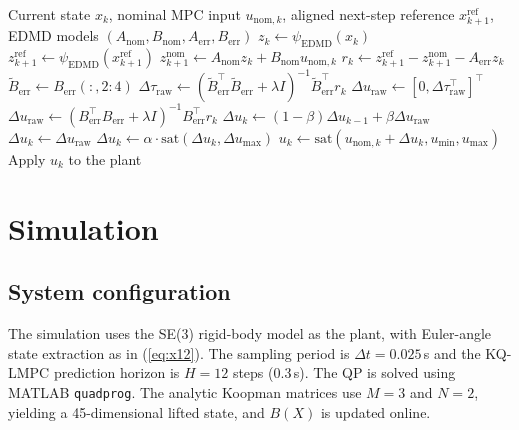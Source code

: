 \documentclass{article}
\begin{document}
\begin{algorithm}[t]
\caption{Residual compensation applied after the KQ-LMPC QP}
\label{alg:residual_comp}
\small
\begin{algorithmic}[1]
\Require Current state $x_k$, nominal MPC input $u_{\mathrm{nom},k}$, aligned next-step reference $x_{k+1}^{\mathrm{ref}}$, EDMD models $(A_{\mathrm{nom}},B_{\mathrm{nom}},A_{\mathrm{err}},B_{\mathrm{err}})$
\State $z_k \gets \psi_{\mathrm{EDMD}}(x_k)$
\State $z_{k+1}^{\mathrm{ref}} \gets \psi_{\mathrm{EDMD}}(x_{k+1}^{\mathrm{ref}})$
\State $z_{k+1}^{\mathrm{nom}} \gets A_{\mathrm{nom}}z_k + B_{\mathrm{nom}}u_{\mathrm{nom},k}$
\State $r_k \gets z_{k+1}^{\mathrm{ref}} - z_{k+1}^{\mathrm{nom}} - A_{\mathrm{err}}z_k$
    \State $\tilde{B}_{\mathrm{err}} \gets B_{\mathrm{err}}(:,2{:}4)$
    \State $\Delta\tau_{\mathrm{raw}} \gets (\tilde{B}_{\mathrm{err}}^{\top}\tilde{B}_{\mathrm{err}}+\lambda I)^{-1}\tilde{B}_{\mathrm{err}}^{\top}r_k$
    \State $\Delta u_{\mathrm{raw}} \gets [0,\Delta\tau_{\mathrm{raw}}^{\top}]^{\top}$
\Else
    \State $\Delta u_{\mathrm{raw}} \gets (B_{\mathrm{err}}^{\top}B_{\mathrm{err}}+\lambda I)^{-1}B_{\mathrm{err}}^{\top}r_k$
\EndIf
{}
    \State $\Delta u_k \gets (1-\beta)\Delta u_{k-1} + \beta \Delta u_{\mathrm{raw}}$
\Else
    \State $\Delta u_k \gets \Delta u_{\mathrm{raw}}$
\EndIf
\State $\Delta u_k \gets \alpha \cdot \mathrm{sat}(\Delta u_k,\Delta u_{\max})$
\State $u_k \gets \mathrm{sat}(u_{\mathrm{nom},k}+\Delta u_k,u_{\min},u_{\max})$
\State Apply $u_k$ to the plant
\end{algorithmic}
\end{algorithm}

\section{Simulation}

\subsection{System configuration}

The simulation uses the SE(3) rigid-body model as the plant, with Euler-angle state extraction as in (\ref{eq:x12}). The sampling period is $\Delta t = 0.025\,$s and the KQ-LMPC prediction horizon is $H=12$ steps ($0.3\,$s). The QP is solved using MATLAB \texttt{quadprog}. The analytic Koopman matrices use $M=3$ and $N=2$, yielding a 45-dimensional lifted state, and $B(X)$ is updated online.
\end{document}
